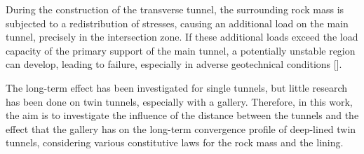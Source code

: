 \documentclass[a4paper,fleqn]{cas-sc}
\begin{document}
During the construction of the transverse tunnel, the surrounding rock mass is subjected to a redistribution of stresses, causing an additional load on the main tunnel, precisely in the intersection zone. If these additional loads exceed the load capacity of the primary support of the main tunnel, a potentially unstable region can develop, leading to failure, especially in adverse geotechnical conditions [].

The long-term effect has been investigated for single tunnels, but little research has been done on twin tunnels, especially with a gallery. Therefore, in this work, the aim is to investigate the influence of the distance between the tunnels and the effect that the gallery has on the long-term convergence profile of deep-lined twin tunnels, considering various constitutive laws for the rock mass and the lining.






\end{document}
